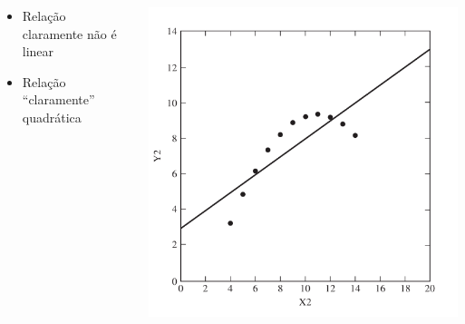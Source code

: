 \documentclass{beamer}
\begin{document}
\begin{frame}
  \begin{columns}
    \begin{column}{.5\textwidth}
      \begin{itemize}
        \tiny
      \item<2> Relação claramente não é linear
      \item<3> Relação ``claramente'' quadrática
      \end{itemize}
    \end{column}
    \begin{column}{.5\textwidth}
      \begin{center}
        \includegraphics[width=\textwidth]{EDA/eda-dispersao2}
      \end{center}
    \end{column}
  \end{columns}
\end{frame}
\end{document}
